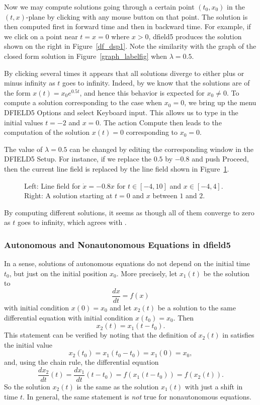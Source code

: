 \documentclass{ximera}
\begin{document}
Now we may compute solutions going through a certain point
$(t_0,x_0)$ in the $(t,x)$-plane by clicking with any mouse
button on that point.  The solution is then computed first in
forward time and then in backward time.  For example, if we
click on a point near $t=x=0$ where $x>0$, {\sf dfield5} produces
the solution shown on the right in Figure~\ref{df_dsp1}.  Note
the similarity with the graph of the closed form solution in
Figure~\ref{graph_labelfig} when $\lambda=0.5$.

By clicking several times it appears that all solutions diverge
to either plus or minus infinity as $t$ goes to infinity.
Indeed, by  we know that the solutions are of the
form $x(t) = x_0 e^{0.5 t}$, and hence this behavior is expected
for $x_0\not= 0$.  To compute a solution corresponding to the case
when $x_0=0$, we bring up the menu {\sf DFIELD5 Options} and select
{\sf Keyboard input}.  This allows us to type in the initial
values $t=-2$ and $x=0$.  The action {\sf Compute} then leads to
the computation of the solution $x(t)=0$ corresponding to $x_0=0$.

The value of $\lambda=0.5$ can be changed by editing the
corresponding window in the {\sf DFIELD5 Setup.} For instance, if
we replace the $0.5$ by $-0.8$ and push {\sf Proceed}, then the
current line field is replaced by the line field shown
in Figure~\ref{df_dsp2}.
\begin{figure}[htb]
    \centerline{%
    }
    \caption{Left: Line field for $\dot{x}=-0.8 x$ for $t\in [-4,10]$
	and $x\in [-4,4]$.  Right: A solution starting at $t=0$ and
	$x$ between $1$ and $2$.}
    \label{df_dsp2}
\end{figure}

By computing different solutions, it seems as though all of them
converge to zero as $t$ goes to infinity, which agrees with
.


\subsubsection*{Autonomous and Nonautonomous Equations in {\sf dfield5}}

In a sense, solutions of autonomous equations do not depend on the initial
time $t_0$, but just on the initial position $x_0$.  More precisely, let
$x_1(t)$ be the solution to
\[
\frac{dx}{dt} = f(x)
\]
with initial condition $x(0)=x_0$ and let $x_2(t)$ be a solution
to the same differential equation with initial condition $x(t_0)=x_0$.
Then
\begin{equation}  \label{E:initdiff}
x_2(t) = x_1(t-t_0).
\end{equation}
This statement can be verified by noting that the definition of
$x_2(t)$ in  satisfies the initial value
\[
x_2(t_0)=x_1(t_0-t_0)=x_1(0)=x_0,
\]
and, using the chain rule, the differential equation
\[
\frac{dx_2}{dt}(t) = \frac{dx_1}{dt}(t-t_0) = f(x_1(t-t_0))=f(x_2(t)).
\]
So the solution $x_2(t)$ is the same as the solution $x_1(t)$ with
just a shift in time $t$.  In general, the same statement is {\em not\/} 
true for nonautonomous equations.
\end{document}
